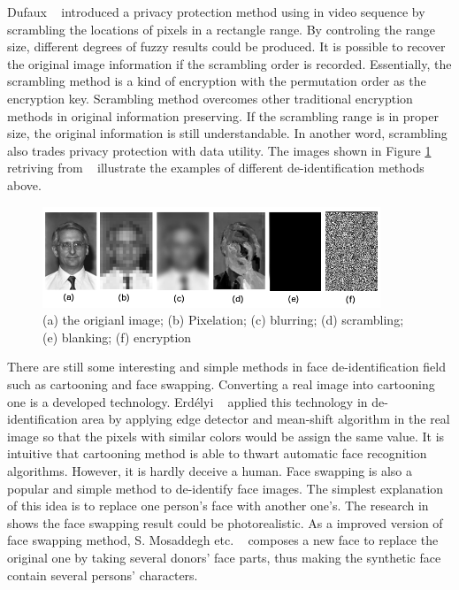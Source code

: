 	\par
	Dufaux ~\cite{dufaux08} introduced a privacy protection method using in video sequence by scrambling the locations of pixels in a rectangle range. By controling the range size, different degrees of fuzzy results could be produced. It is possible to recover the original image information if the scrambling order is recorded. Essentially, the scrambling method is a kind of encryption with the permutation order as the encryption key. Scrambling method overcomes other traditional encryption methods in original information preserving. If the scrambling range is in proper size, the original information is still understandable. In another word, scrambling also trades privacy protection with data utility. The images shown in Figure \ref{adhoc_example} retriving from ~\cite{dufaux08} illustrate the examples of different de-identification methods above. 
	\begin{figure}[!htb]
		  \centering
		  \includegraphics[width=0.9\textwidth]{figure/adhoc.png} 
		  \caption{(a) the origianl image; (b) Pixelation; (c) blurring; (d) scrambling; (e) blanking; (f) encryption}
		  \label{adhoc_example}
	\end{figure}

	\par
	There are still some interesting and simple methods in face de-identification field such as cartooning and face swapping. Converting a real image into cartooning one is a developed technology. Erdélyi ~\cite{erdely14} applied this technology in de-identification area by applying edge detector and mean-shift algorithm in the real image so that the pixels with similar colors would be assign the same value. It is intuitive that cartooning method is able to thwart automatic face recognition algorithms. However, it is hardly deceive a human. Face swapping is also a popular and simple method to de-identify face images. The simplest explanation of this idea is to replace one person's face with another one's. The research in ~\cite{CAVE08} shows the face swapping result could be photorealistic. As a improved version of face swapping method, S. Mosaddegh etc. ~\cite{Mosa14} composes a new face to replace the original one by taking several donors' face parts, thus making the synthetic face contain several persons' characters. 

